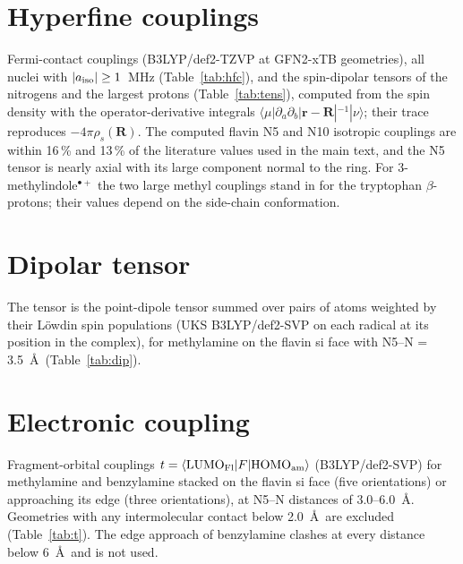 \documentclass[11pt]{article}
\begin{document}
\section{Hyperfine couplings}
Fermi-contact couplings (B3LYP/def2-TZVP at GFN2-xTB geometries), all nuclei
with $|a_{\rm iso}|\ge1$~MHz (Table~\ref{tab:hfc}), and the spin-dipolar tensors
of the nitrogens and the largest protons (Table~\ref{tab:tens}), computed from
the spin density with the operator-derivative integrals
$\langle\mu|\partial_a\partial_b|\mathbf r-\mathbf R|^{-1}|\nu\rangle$; their
trace reproduces $-4\pi\rho_s(\mathbf R)$. The computed flavin N5 and N10
isotropic couplings are within 16\,\% and 13\,\% of the literature values used in
the main text,\cite{Lee2014} and the N5 tensor is nearly axial with its large
component normal to the ring. For 3-methylindole$^{\bullet+}$ the two large
methyl couplings stand in for the tryptophan $\beta$-protons; their values
depend on the side-chain conformation.

\begin{table}[h]
\caption{Isotropic hyperfine couplings.}
\label{tab:hfc}
\centering

\end{table}

\begin{table}[h]
\caption{Spin-dipolar hyperfine tensors.}
\label{tab:tens}
\centering

\end{table}

\section{Dipolar tensor}
The tensor is the point-dipole tensor summed over pairs of atoms weighted by
their Löwdin\cite{Lowdin1950} spin populations (UKS B3LYP/def2-SVP on each radical at its position
in the complex), for methylamine on the flavin si face with N5--N = 3.5~\AA\
(Table~\ref{tab:dip}).

\begin{table}[h]
\caption{Dipolar coupling of the contact pair.}
\label{tab:dip}
\centering

\end{table}

\section{Electronic coupling}
Fragment-orbital couplings\cite{Valeev2006} $t = \langle{\rm LUMO_{Fl}}|F|{\rm HOMO_{am}}\rangle$
(B3LYP/def2-SVP) for methylamine and benzylamine stacked on the flavin si face
(five orientations) or approaching its edge (three orientations), at N5--N
distances of 3.0--6.0~\AA. Geometries with any intermolecular contact below
2.0~\AA\ are excluded (Table~\ref{tab:t}). The edge approach of benzylamine
clashes at every distance below 6~\AA\ and is not used.
\end{document}
